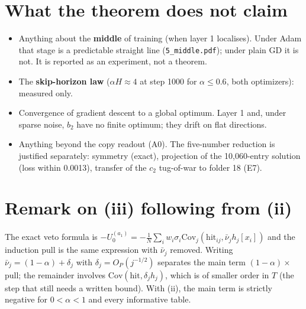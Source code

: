 \documentclass[11pt]{article}
\theoremstyle{definition}\newtheorem{assumption}{Assumption}
\theoremstyle{remark}\newtheorem{remark}{Remark}
\newcommand{\1}{\mathbf{1}}
\begin{document}
\section{What the theorem does not claim}
\begin{itemize}
\item Anything about the \textbf{middle} of training (when layer 1 localises). Under Adam that stage is
a predictable straight line (\texttt{5\_middle.pdf}); under plain GD it is not. It is reported as an
experiment, not a theorem.
\item The \textbf{skip-horizon law} ($\alpha H\approx4$ at step 1000 for $\alpha\le0.6$, both optimizers):
measured only.
\item Convergence of gradient descent to a global optimum. Layer 1 and, under sparse noise, $b_2$ have
no finite optimum; they drift on flat directions.
\item Anything beyond the copy readout (A0). The five-number reduction is justified separately:
symmetry (exact), projection of the 10,060-entry solution (loss within 0.0013), transfer of the
$c_2$ tug-of-war to folder 18 (E7).
\end{itemize}

\section{Remark on (iii) following from (ii)}
The exact veto formula is $-U_0^{(a_1)}=-\frac1N\sum_iw_i\sigma_i\mathrm{Cov}_j(\mathrm{hit}_{ij},\bar\nu_jh_j[x_i])$ and
the induction pull is the same expression with $\bar\nu_j$ removed. Writing
$\bar\nu_j=(1-\alpha)+\delta_j$ with $\delta_j=O_P(j^{-1/2})$ separates the main term
$(1-\alpha)\times$pull; the remainder involves $\mathrm{Cov}(\mathrm{hit},\delta_jh_j)$, which is of
smaller order in $T$ (the step that still needs a written bound). With (ii), the main term is
strictly negative for $0<\alpha<1$ and every informative table.
\end{document}
